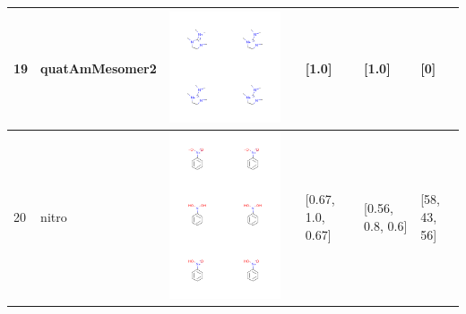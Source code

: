 \begin{longtable}{|l|l|l|l|l|l|l|}
\hline
19 & quatAmMesomer2 & \includegraphics[scale=0.6]{quatAmMesomer2MV.png} & & [1.0]& [1.0] & [0] \\
\hline
20 & nitro & \includegraphics[scale=0.6]{nitroMV.png} & & [0.67, 1.0, 0.67]& [0.56, 0.8, 0.6] & [58, 43, 56] \\

\end{longtable}
